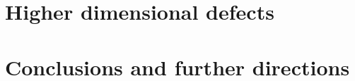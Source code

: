 \documentclass[11pt]{amsart}
\def\brian#1{{\textcolor{blue!65!red}{BRW: {#1}}}}
\begin{document}
\section{Higher dimensional defects} 


\section{Conclusions and further directions}

\printbibliography
\end{document}
